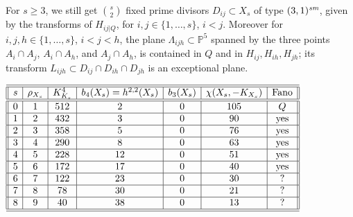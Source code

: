 \documentclass[a4paper,12pt]{amsart}
\theoremstyle{definition}
\numberwithin{figure}{section}
\numberwithin{table}{section}
\newcommand{\pr}{\mathbb{P}}
\newcommand{\sm}{\text{\it sm}}
\begin{document}
 \bigskip

 For $s\geq 3$, we still get $\binom{s}{2}$ fixed prime divisors $D_{ij}\subset X_s$ of type $(3,1)^{\sm}$, given by the transforms of $H_{ij|Q}$, for $i,j\in\{1,\dotsc,s\}$, $i<j$. Moreover for $i,j,h\in\{1,\dotsc,s\}$, $i<j<h$,
  the plane $\Lambda_{ijh}\subset\pr^5$ spanned by the three points $A_i\cap A_j$, $A_i\cap A_h$, and $A_j\cap A_h$, is contained in $Q$ and in $H_{ij},H_{ih},H_{jh}$; its transform $L_{ijh}\subset D_{ij}\cap D_{ih}\cap D_{jh}$ is an exceptional plane.

{\small
\begin{table}[h]
 $\begin{array}{||c|c|c|c|c|c|c||}
   \hline\hline
   
s   & \rho_{X_s} & K_{K_s}^4 & b_4(X_s)=h^{2,2}(X_s) & b_3(X_s)& \chi(X_s,-K_{X_s}) & \text{Fano}\\
      \hline\hline

         0 & 1 & 512 & 2 & 0 & 105 & Q \\

        \hline

       1 & 2 & 432 & 3  & 0 & 90 & \text{yes} \\

       \hline

     2 & 3 & 358 & 5 & 0 & 76  & \text{yes}\\
       
  \hline

      3 & 4 & 290 & 8  & 0 & 63 & \text{yes}\\

        \hline

    4  & 5 & 228 & 12  & 0 & 51 & \text{yes}\\

     \hline

       5 & 6 & 172 & 17  & 0 & 40 & \text{yes} \\

       \hline

     6 & 7 & 122 & 23 & 0 & 30 & ? \\
   
  \hline

      7 & 8 & 78 & 30  & 0 & 21& ? \\

        \hline

      8  & 9 & 40 & 38  & 0 & 13 & ?\\
      
\hline\hline
  \end{array}$

\bigskip
  
  \caption{Invariants of the blow-ups of a quadric $4$-fold along $s$ planes}\label{t2}
\end{table}}
\end{document}
